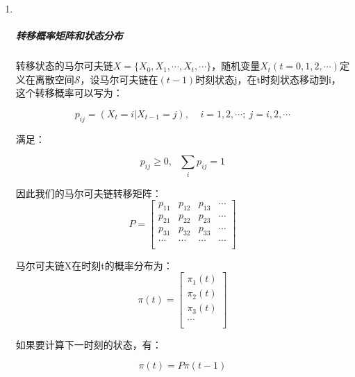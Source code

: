 \begin{enumerate}
\def\labelenumi{\arabic{enumi}.}
\item ~
  \hypertarget{ux8f6cux79fbux6982ux7387ux77e9ux9635ux548cux72b6ux6001ux5206ux5e03}{%
  \subparagraph{转移概率矩阵和状态分布}\label{ux8f6cux79fbux6982ux7387ux77e9ux9635ux548cux72b6ux6001ux5206ux5e03}}

  转移状态的马尔可夫链\(X=\{X_0,X_1,\cdots,X_t,\cdots\}\)，随机变量\(X_t(t=0,1,2,\cdots)\)定义在离散空间\(\mathcal{S}\)，设马尔可夫链在\((t-1)\)时刻状态j，在t时刻状态移动到i，这个转移概率可以写为：

  \[p_{ij} = (X_t=i|X_{t-1}=j),\ \ \ \ \ i=1,2,\cdots;\   j=i,2,\cdots\]

  满足：

  \[p_{ij}\geq0,\ \ \ \sum_{i}p_{ij}=1  \tag{2.1}\]

  因此我们的马尔可夫链转移矩阵：
\begin{equation}
  P=
  \begin{bmatrix} 
    p_{11} & p_{12} & p_{13} & \cdots\\
    p_{21} & p_{22} & p_{23} & \cdots\\
    p_{31} & p_{32} & p_{33} & \cdots\\
    \cdots & \cdots & \cdots & \cdots\\
    \end{bmatrix} 
\end{equation}

  马尔可夫链X在时刻t的概率分布为：
\begin{equation}
  \pi(t)=
  \begin{bmatrix} 
  \pi_{1}(t)\\
  \pi_{2}(t)\\
  \pi_{3}(t)\\
  \cdots\\
  \end{bmatrix} 
\end{equation}

  如果要计算下一时刻的状态，有：

  \[\pi(t)=P\pi(t-1) \tag{2.2}\]


\end{enumerate}
